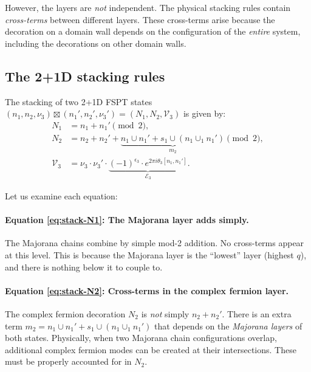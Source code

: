 \documentclass{SciPost}
\theoremstyle{definition}
\begin{document}
However, the layers are \emph{not} independent.
The physical stacking rules contain \emph{cross-terms} between different layers.
These cross-terms arise because the decoration on a domain wall depends on the configuration of the \emph{entire} system, including the decorations on other domain walls.

\subsection{The 2+1D stacking rules}
\label{subsec:2d-stacking}

The stacking of two 2+1D FSPT states $(n_1, n_2, \nu_3) \boxtimes (n_1', n_2', \nu_3') = (N_1, N_2, \mathcal{V}_3)$ is given by:
\begin{align}
N_1 &= n_1 + n_1' \pmod{2}, \label{eq:stack-N1} \\
N_2 &= n_2 + n_2' + \underbrace{n_1 \cup n_1' + s_1 \cup (n_1 \cup_1 n_1')}_{m_2} \pmod{2}, \label{eq:stack-N2} \\
\mathcal{V}_3 &= \nu_3 \cdot \nu_3' \cdot \underbrace{(-1)^{\epsilon_3} \cdot e^{2\pi i \theta_3[n_1, n_1']}}_{\mathcal{E}_3}. \label{eq:stack-V3}
\end{align}

Let us examine each equation:

\paragraph{Equation \eqref{eq:stack-N1}: The Majorana layer adds simply.}
The Majorana chains combine by simple mod-2 addition.
No cross-terms appear at this level.
This is because the Majorana layer is the ``lowest'' layer (highest $q$), and there is nothing below it to couple to.

\paragraph{Equation \eqref{eq:stack-N2}: Cross-terms in the complex fermion layer.}
The complex fermion decoration $N_2$ is \emph{not} simply $n_2 + n_2'$.
There is an extra term $m_2 = n_1 \cup n_1' + s_1 \cup (n_1 \cup_1 n_1')$ that depends on the \emph{Majorana layers} of both states.
Physically, when two Majorana chain configurations overlap, additional complex fermion modes can be created at their intersections.
These must be properly accounted for in $N_2$.
\end{document}
